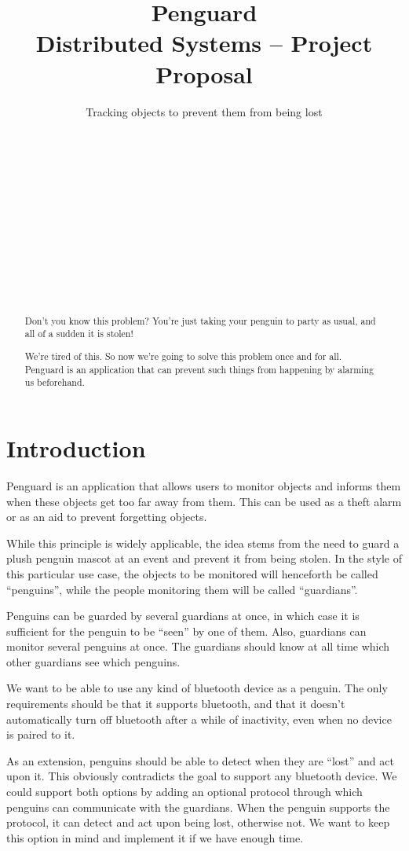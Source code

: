 \documentclass{report}
\title{Penguard\\
\normalsize{Distributed Systems -- Project Proposal}}
\subtitle{Tracking objects to prevent them from being lost}
\author{
\alignauthor {\normalsize Nils Leuzinger}\\
	\affaddr{{\normalsize 14-939-896}}\\
	\email{{\normalsize nilsl@student.ethz.ch}}
\alignauthor {\normalsize Nicole Thurnherr}\\
	\affaddr{{\normalsize 11-925-328}}\\
	\email{{\normalsize nicoleth@student.ethz.ch}}
\alignauthor {\normalsize Aline Abler}\\
	\affaddr{{\normalsize 14-920-979}}\\
	\email{{\normalsize ablera@student.ethz.ch}}
\and
\alignauthor {\normalsize Sascha Tribelhorn}\\
	\affaddr{{\normalsize 13-914-692}}\\
	\email{{\normalsize tsascha@student.ethz.ch}}
\alignauthor {\normalsize Luca Wolf}\\
	\affaddr{{\normalsize 12-913-539}}\\
	\email{{\normalsize lwolf@student.ethz.ch}}
}
\begin{document}
\maketitle

\begin{abstract}
Don't you know this problem? You're just taking your penguin to party as usual, and all of a sudden it is stolen! 

We're tired of this. So now we're going to solve this problem once and for all. Penguard is an application that can prevent such things from happening by alarming us beforehand.
\end{abstract}

\section{Introduction}

Penguard is an application that allows users to monitor objects and informs them when these objects get too far away from them. This can be used as a theft alarm or as an aid to prevent forgetting objects.

While this principle is widely applicable, the idea stems from the need to guard a plush penguin mascot at an event and prevent it from being stolen. In the style of this particular use case, the objects to be monitored will henceforth be called ``penguins'', while the people monitoring them will be called ``guardians''.

Penguins can be guarded by several guardians at once, in which case it is sufficient for the penguin to be ``seen'' by one of them. Also, guardians can monitor several penguins at once. The guardians should know at all time which other guardians see which penguins.

We want to be able to use any kind of bluetooth device as a penguin. The only requirements should be that it supports bluetooth, and that it doesn't automatically turn off bluetooth after a while of inactivity, even when no device is paired to it.

As an extension, penguins should be able to detect when they are ``lost'' and act upon it. This obviously contradicts the goal to support any bluetooth device. We could support both options by adding an optional protocol through which penguins can communicate with the guardians. When the penguin supports the protocol, it can detect and act upon being lost, otherwise not. We want to keep this option in mind and implement it if we have enough time.
\end{document}
